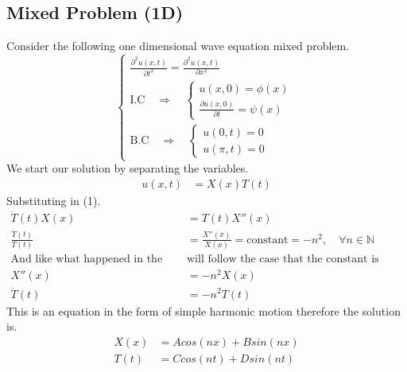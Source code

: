 \documentclass[]{article}
\begin{document}
\subsection{Mixed Problem (1D)}
Consider the following one dimensional wave equation mixed problem.
\begin{equation}
    \begin{cases}
        \displaystyle \frac{\partial^2 u\left(x,t\right)}{\partial t^2}=\frac{\partial^2 u\left(x,t\right)}{\partial x^2}
        \\
        \text{I.C} \quad \Longrightarrow \quad 
        \begin{cases}
            u\left(x,0 \right) = \phi\left(x\right)
            \\
            \displaystyle \frac{\partial u\left(x,0 \right)}{\partial t} = \psi\left(x\right)
        \end{cases}
        \\
        \text{B.C} \quad \Longrightarrow \quad 
        \begin{cases}
            u\left(0,t \right) = 0
            \\
            u\left(\pi,t\right)=0
        \end{cases}   
    \end{cases}
\end{equation}
We start our solution by separating the variables.
\begin{align}
u\left(x,t\right) &= X\left(x\right)T\left(t\right)
\end{align}
Substituting in (1).
\begin{align*}
\ddot{T}\left(t\right)X\left(x\right)&=T\left(t\right)X''\left(x\right)
\\
\frac{\ddot{T}\left(t\right)}{T\left(t\right)} &= \frac{X''\left(x\right)}{X\left(x\right)}= \text{constant} = - n^2,\quad \forall n \in \mathbb{N}
\\
\text{And like what happened in the heat equation we }&\text{will follow the case that the constant is negative}
\\
X''\left(x\right)&=-n^2 X\left(x\right)
\\
\ddot{T}\left(t\right) &= -n^2 T\left(t\right)
\end{align*}
This is an equation in the form of simple harmonic motion therefore the solution is.
\begin{align*}
X\left(x\right) &= Acos\left(nx\right)+Bsin\left(nx\right)
\\
T\left(t\right) &= Ccos\left(nt\right)+Dsin\left(nt\right)
\end{align*}
\end{document}
